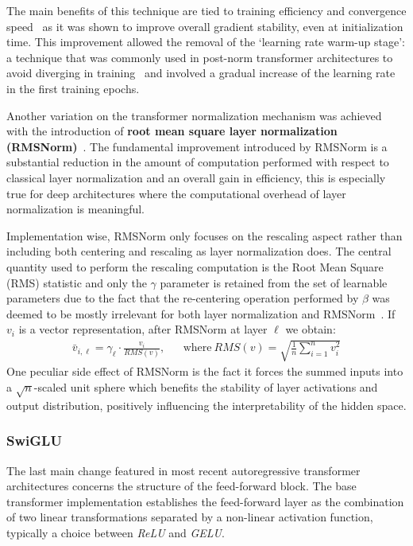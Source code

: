 The main benefits of this technique are tied to training efficiency and convergence speed~\cite{xiong2020} as it was shown to improve overall gradient stability, even at initialization time.
This improvement allowed the removal of the `learning rate warm-up stage': a technique that was commonly used in post-norm transformer architectures to avoid diverging in training~\cite{popel2018} and involved a gradual increase of the learning rate in the first training epochs.

Another variation on the transformer normalization mechanism was achieved with the introduction of \textbf{root mean square layer normalization (RMSNorm)}~\cite{zhang2019}.
The fundamental improvement introduced by RMSNorm is a substantial reduction in the amount of computation performed with respect to classical layer normalization and an overall gain in efficiency, this is especially true for deep architectures where the computational overhead of layer normalization is meaningful.

Implementation wise, RMSNorm only focuses on the rescaling aspect rather than including both centering and rescaling as layer normalization does.
The central quantity used to perform the rescaling computation is the Root Mean Square (RMS) statistic and only the $\gamma$ parameter is retained from the set of learnable parameters due to the fact that the re-centering operation performed by $\beta$ was deemed to be mostly irrelevant for both layer normalization and RMSNorm~\cite{zhang2019}.
If $v_i$ is a vector representation, after RMSNorm at layer $\ell$ we obtain:
\begin{equation}
    \label{eq:background_rmsnorm}
    \begin{aligned}
        \bar v_{i,\ell} = \gamma_\ell \cdot \frac{v_i}{RMS(v)}, &&
        \text{where}\ RMS(v) = \sqrt{\frac{1}{n}\sum_{i=1}^{n}{v_i^2}}
    \end{aligned}
\end{equation}
One peculiar side effect of RMSNorm is the fact it forces the summed inputs into a $\sqrt{n}$-scaled unit sphere which benefits the stability of layer activations and output distribution, positively influencing the interpretability of the hidden space.

\subsubsection*{SwiGLU}

The last main change featured in most recent autoregressive transformer architectures concerns the structure of the feed-forward block.
The base transformer implementation establishes the feed-forward layer as the combination of two linear transformations separated by a non-linear activation function, typically a choice between \emph{ReLU} and \emph{GELU}.

